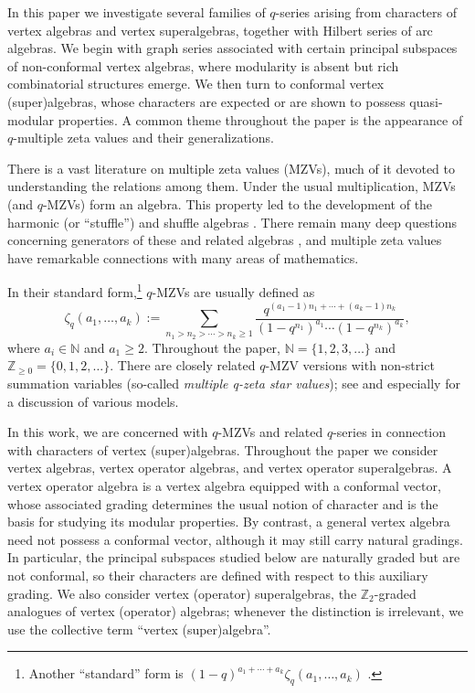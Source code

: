 \documentclass[pdftex]{sigma}
\numberwithin{equation}{section}
\theoremstyle{definition}
\begin{document}
In this paper we investigate several families of $q$-series arising from characters of vertex algebras and vertex superalgebras, together with Hilbert series of arc algebras. We begin with graph series associated with certain principal subspaces of non-conformal vertex algebras, where modularity is absent but rich combinatorial structures emerge. We then turn to conformal vertex (super)algebras, whose characters are expected or are shown to possess quasi-modular properties. A common theme throughout the paper is the appearance of $q$-multiple zeta values and their generalizations.

There is a vast literature on multiple zeta values (MZVs), much of it devoted to understanding the relations among them. Under the usual multiplication, MZVs (and $q$-MZVs) form an algebra. This property led to the development of the harmonic (or ``stuffle'') and shuffle algebras \cite{Hoffman}. There remain many deep questions concerning generators of these and related algebras \cite{BK2,BK1,Bradley,Goncharov,Zagier1,Ohno,Zagier2,Zudilin2,Zudilin1}, and multiple zeta values have remarkable connections with many areas of mathematics.

In their standard form,\footnote{Another ``standard'' form is $(1-q)^{a_1+ \cdots + a_k}\zeta_q(a_1,\dots,a_k)$ \cite{Bradley}.} $q$-MZVs are usually defined as
\begin{equation} \label{mzvq}
\zeta_q(a_1,\dots,a_k):=\sum_{n_1 > n_2 > \cdots > n_k \geq 1} \frac{q^{(a_1-1)n_1+\cdots + (a_k-1)n_k}}{(1-q^{n_1})^{a_1} \cdots (1-q^{n_k})^{a_k}},
\end{equation}
where $a_i \in \mathbb{N}$ and $a_1 \geq 2$. Throughout the paper, $\mathbb{N}=\{1,2,3,\dots\}$ and $\mathbb{Z}_{\geq 0}=\{0,1,2,\dots\}$.
There are closely related $q$-MZV versions with non-strict summation variables (so-called {\em multiple q-zeta star values}); see \cite{Ohno} and especially \cite{BK2,BK3} for a discussion of various models.

In this work, we are concerned with $q$-MZVs and related $q$-series in connection with characters of vertex (super)algebras.
Throughout the paper we consider vertex algebras, vertex operator algebras,
and vertex operator superalgebras. A vertex operator algebra is a vertex algebra
equipped with a conformal vector, whose associated grading determines the usual notion of character
and is the basis for studying its modular properties. By contrast, a
general vertex algebra need not possess a conformal vector, although it may
still carry natural gradings. In particular, the principal subspaces studied below are naturally graded but are not conformal, so their characters
are defined with respect to this auxiliary grading. We also consider vertex (operator) superalgebras, the
$\mathbb Z_2$-graded analogues of vertex (operator) algebras; whenever the distinction is
irrelevant, we use the collective term ``vertex (super)algebra''.
\end{document}
